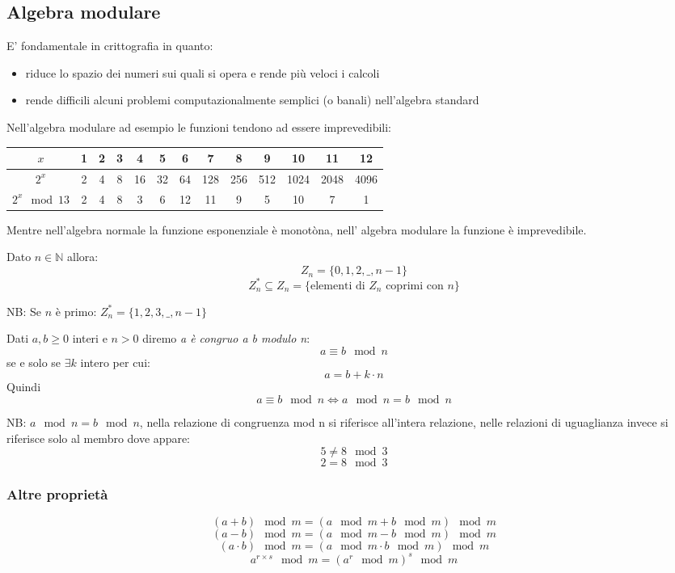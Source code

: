 \subsection{Algebra modulare}
E' fondamentale in crittografia in quanto:
\begin{itemize}
    \item riduce lo spazio dei numeri sui quali si opera e rende più veloci i calcoli
    \item rende difficili alcuni problemi computazionalmente semplici (o banali) nell'algebra standard
\end{itemize}

Nell'algebra modulare ad esempio le funzioni tendono ad essere imprevedibili:
\begin{table}[ht!]
    \centering
    \small
    \begin{tabular}{c|c c c c c c c c c c c c}
        $x$ & 1 & 2 & 3 & 4 & 5 & 6 & 7 & 8 & 9 & 10 & 11 & 12  \\
        \hline
        $2^{x}$ & 2 & 4 & 8 & 16 & 32 & 64 & 128 & 256 & 512 & 1024 & 2048 & 4096  \\
        $2^{x} \mod 13$ & 2 & 4 & 8 & 3 & 6 & 12 & 11 & 9 & 5 & 10 & 7 & 1  \\
    \end{tabular}
\end{table}

Mentre nell'algebra normale la funzione esponenziale è monotòna, nell' algebra modulare la funzione è imprevedibile.

Dato $n \in \mathbb{N}$ allora:
$$ Z_{n} = \{ 0, 1, 2, \_, n-1 \} $$
$$ Z_{n}^{*} \subseteq Z_{n} = \{\text{elementi di $Z_{n}$ coprimi con $n$}\} $$


NB: Se $n$ è primo: $Z_{n}^* = \{1, 2, 3, \_, n-1\}$

Dati $a, b \geq 0$ interi e $n > 0$ diremo \emph{a è congruo a b modulo n}:
$$ a \equiv b \mod n $$
se e solo se $\exists k$ intero per cui:
$$ a = b + k \cdot n $$
Quindi
$$ a \equiv b \mod n \iff a \mod n = b \mod n $$

NB: $a \mod n = b \mod n$, nella relazione di congruenza mod n si riferisce all'intera relazione, nelle relazioni di uguaglianza invece si riferisce solo al membro dove appare:
$$ 5 \neq 8 \mod 3 $$
$$ 2 = 8 \mod 3 $$

\subsubsection{Altre proprietà}
$$ (a+b) \mod m = (a \mod m + b \mod m) \mod m $$
$$ (a-b) \mod m = (a \mod m - b \mod m) \mod m $$
$$ (a \cdot b) \mod m = (a \mod m \cdot b \mod m) \mod m $$
$$ a^{r \times s} \mod m = (a^r \mod m)^{s} \mod m $$

